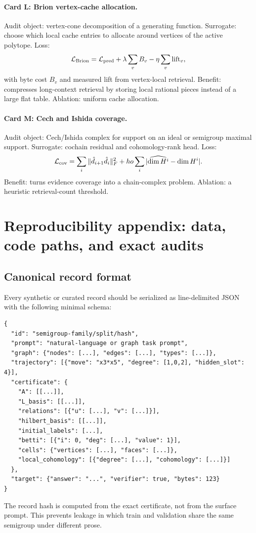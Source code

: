 \documentclass[11pt]{article}
\theoremstyle{definition}
\begin{document}
\paragraph{Card L: Brion vertex-cache allocation.}
Audit object: vertex-cone decomposition of a generating function.  Surrogate: choose which local cache entries to allocate around vertices of the active polytope.  Loss:
\[
\mathcal L_{\rm Brion}=\mathcal L_{\rm pred}+\lambda\sum_v B_v-\eta\sum_v \mathrm{lift}_v,
\]
with byte cost \(B_v\) and measured lift from vertex-local retrieval.  Benefit: compresses long-context retrieval by storing local rational pieces instead of a large flat table.  Ablation: uniform cache allocation.

\paragraph{Card M: Cech and Ishida coverage.}
Audit object: Cech/Ishida complex for support on an ideal or semigroup maximal support.  Surrogate: cochain residual and cohomology-rank head.  Loss:
\[
\mathcal L_{\rm cov}=\sum_i\|\hat d_{i+1}\hat d_i\|_F^2+
ho\sum_i|\widehat{\dim H^i}-\dim H^i|.
\]
Benefit: turns evidence coverage into a chain-complex problem.  Ablation: a heuristic retrieval-count threshold.

\section{Reproducibility appendix: data, code paths, and exact audits}
\subsection{Canonical record format}
Every synthetic or curated record should be serialized as line-delimited JSON with the following minimal schema:
\begin{verbatim}
{
  "id": "semigroup-family/split/hash",
  "prompt": "natural-language or graph task prompt",
  "graph": {"nodes": [...], "edges": [...], "types": [...]},
  "trajectory": [{"move": "x3*x5", "degree": [1,0,2], "hidden_slot": 4}],
  "certificate": {
    "A": [[...]],
    "L_basis": [[...]],
    "relations": [{"u": [...], "v": [...]}],
    "hilbert_basis": [[...]],
    "initial_labels": [...],
    "betti": [{"i": 0, "deg": [...], "value": 1}],
    "cells": {"vertices": [...], "faces": [...]},
    "local_cohomology": [{"degree": [...], "cohomology": [...]}]
  },
  "target": {"answer": "...", "verifier": true, "bytes": 123}
}
\end{verbatim}
The record hash is computed from the exact certificate, not from the surface prompt.  This prevents leakage in which train and validation share the same semigroup under different prose.
\end{document}
